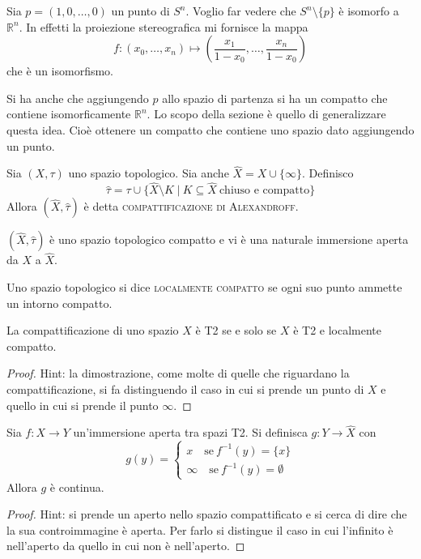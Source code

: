 \begin{ex}
    Sia $p=(1,0,\dots,0)$ un punto di $S^n$. Voglio far vedere che $S^n\setminus\{p\}$ \`e isomorfo a $\mathbb{R}^n$. In effetti la proiezione stereografica mi fornisce la mappa
    \[
        f\colon(x_0, \dots, x_n)\mapsto\left(\frac{x_1}{1-x_0}, \dots, \frac{x_n}{1-x_0}\right)
    \]
    che \`e un isomorfismo.

    Si ha anche che aggiungendo $p$ allo spazio di partenza si ha un compatto che contiene isomorficamente $\mathbb{R}^n$. Lo scopo della sezione \`e quello di generalizzare questa idea. Cio\`e ottenere un compatto che contiene uno spazio dato aggiungendo un punto.
\end{ex}

\begin{defn}
    Sia $(X,\tau)$ uno spazio topologico. Sia anche $\hat{X} = X \cup \{\infty\}$. Definisco
    \[
        \hat{\tau} = \tau \cup \{\hat{X}\setminus K\; |\ K \subseteq \hat{X}\  \text{chiuso e compatto}\}
    \]
    Allora $(\hat{X}, \hat{\tau})$ \`e detta \textsc{compattificazione di Alexandroff}.
\end{defn}

\begin{oss}
    $(\hat{X}, \hat{\tau})$ \`e uno spazio topologico compatto e vi \`e una naturale immersione aperta da $X$ a $\hat{X}$.
\end{oss}

\begin{defn}
    Uno spazio topologico si dice \textsc{localmente compatto} se ogni suo punto ammette un intorno compatto.
\end{defn}

\begin{prop}
    La compattificazione di uno spazio $X$ \`e T2 se e solo se $X$ \`e T2 e localmente compatto.
\end{prop}
\begin{proof}
    Hint: la dimostrazione, come molte di quelle che riguardano la compattificazione, si fa distinguendo il caso in cui si prende un punto di $X$ e quello in cui si prende il punto $\infty$.
\end{proof}

\begin{prop}
    Sia $f\colon X \longrightarrow Y$ un'immersione aperta tra spazi T2. Si definisca $g\colon Y \longrightarrow \hat{X}$ con
    \[
        g(y) =
        \begin{cases}
            x\quad \text{se}\ f^{-1}(y) = \{x\}\\
            \infty \quad\text{se}\ f^{-1}(y) = \emptyset
        \end{cases}
    \]
    Allora $g$ \`e continua.
\end{prop}
\begin{proof}
    Hint: si prende un aperto nello spazio compattificato e si cerca di dire che la sua controimmagine \`e aperta. Per farlo si distingue il caso in cui l'infinito \`e nell'aperto da quello in cui non \`e nell'aperto.
\end{proof}

